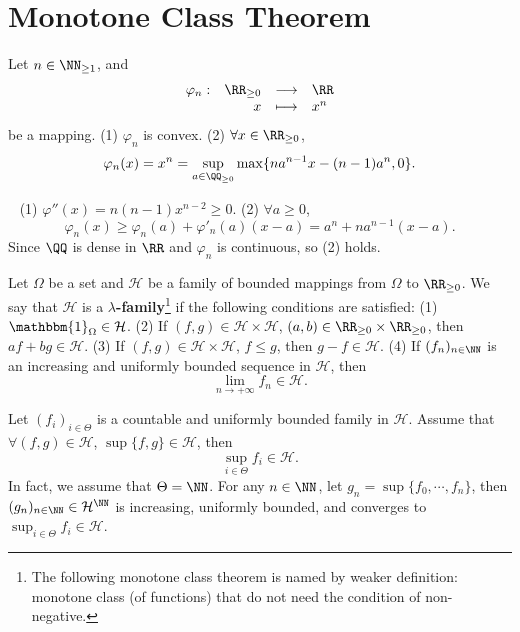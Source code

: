 \section{Monotone Class Theorem}
\begin{lemmaenv}
    Let $n\in\NN_{\ge 1}$, and
    $$\begin{array}{rrcl}
        \varphi_n:&\RR_{\ge 0}&\longrightarrow& \RR\\
        & x&\longmapsto &x^n
    \end{array}$$
    be a mapping.
    \newline
    (1) $\varphi_n$ is convex.
    \newline
    (2) $\forall x\in \RR_{\ge 0}$,
    $$ \varphi_n(x)=x^n=\sup_{a\in \QQ_{\ge 0}} \max\{na^{n-1}x-(n-1)a^n,0\}.$$
\end{lemmaenv}
\begin{proofenv}
    \ \newline
    (1) $\varphi''(x)=n(n-1)x^{n-2}\ge 0$.
    \newline
    (2) $\forall a\ge 0$, 
    $$ \varphi_n(x)\ge \varphi_n(a)+\varphi'_n(a)(x-a)=a^n+na^{n-1}(x-a).$$
    Since $\QQ$ is dense in $\RR$ and $\varphi_n$ is continuous, so (2) holds.
\end{proofenv}
\begin{definitionenv}
    Let $\Omega$ be a set and $\mathcal{H}$ be a family of bounded mappings from $\Omega$ to $\RR_{\ge 0}$. We say that $\mathcal{H}$ is a \textbf{$\lambda$-family}\footnote{The following monotone class theorem is named by weaker definition: monotone class (of functions) that do not need the condition of non-negative.} if the following conditions are satisfied:
    \newline
    (1) $\mathbbm{1}_{\Omega}\in \mathcal{H}$.
    \newline
    (2) If $(f,g)\in \mathcal{H}\times \mathcal{H}$, $(a,b)\in \RR_{\ge 0}\times \RR_{\ge 0}$, then $af+bg\in \mathcal{H}$.
    \newline
    (3) If $(f,g)\in \mathcal{H}\times \mathcal{H}$, $f\le g$, then $g-f\in \mathcal{H}$.
    \newline
    (4) If $(f_n)_{n\in \NN}$ is an increasing and uniformly bounded sequence in $\mathcal{H}$, then
    $$ \lim_{n\rightarrow +\infty} f_n \in \mathcal{H}.$$
\end{definitionenv}
\begin{remark}
    Let $(f_i)_{i\in \Theta}$ is a countable and uniformly bounded family in $\mathcal{H}$. Assume that $\forall(f,g)\in \mathcal{H}$, $\sup\{f,g\}\in \mathcal{H}$, then 
    $$ \sup_{i\in \Theta} f_i \in \mathcal{H}.$$
    In fact, we assume that $\Theta=\NN$. For any $n\in \NN$, let $g_n=\sup\{f_0,\cdots,f_n\}$, then $(g_n)_{n\in \NN}\in \mathcal{H}^\NN$ is increasing, uniformly bounded, and converges to $\sup_{i\in \Theta}f_i\in \mathcal{H}$.
\end{remark}
